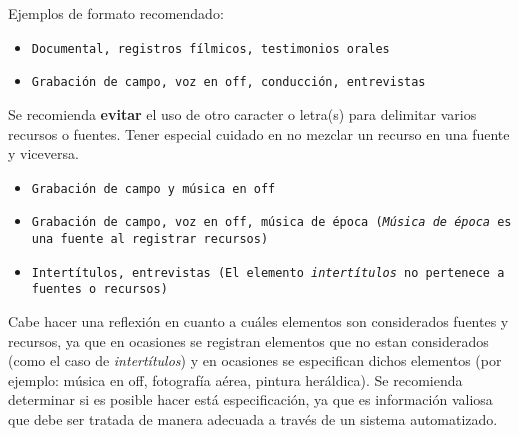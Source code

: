 \documentclass[10pt,letterpaper]{article}
\begin{document}
Ejemplos de formato recomendado:
{\color{Blue}
\begin{itemize}
	\item \texttt{Documental, registros fílmicos, testimonios orales}
	\item \texttt{Grabación de campo, voz en off, conducción, entrevistas}
\end{itemize}
}

Se recomienda \textbf{evitar} el uso de otro caracter o letra(s) para delimitar varios recursos o fuentes. Tener especial cuidado en no mezclar un recurso en una fuente y viceversa.
{\color{Red}
\begin{itemize}
	\item \texttt{Grabación de campo y música en off}
	\item \texttt{Grabación de campo, voz en off, música de época (\textit{Música de época} es una fuente al registrar recursos)}
	\item \texttt{Intertítulos, entrevistas (El elemento \textit{intertítulos} no pertenece a fuentes o recursos)}
\end{itemize}
}

Cabe hacer una reflexión en cuanto a cuáles elementos son considerados fuentes y recursos, ya que en ocasiones se registran elementos que no estan considerados (como el caso de \textit{intertítulos}) y en ocasiones se especifican dichos elementos (por ejemplo: música en off, fotografía aérea, pintura heráldica). Se recomienda determinar si es posible hacer está especificación, ya que es información valiosa que debe ser tratada de manera adecuada a través de un sistema automatizado.
\end{document}
